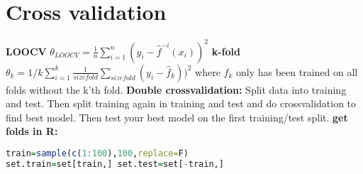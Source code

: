 \section{Cross validation}
\textbf{LOOCV} $\theta_{LOOCV} = \frac{1}{n}\sum_{i=1}^n(y_i - \hat f^{-i}(x_i))^2$
\textbf{k-fold} $\theta_k = 1/k\sum_{i=1}^k \frac{1}{size fold}\sum_{size fold}(y_i-\hat f_k))^2$ where $f_k$ only has been trained on all folds without the k'th fold. 
\textbf{Double crossvalidation: }Split data into training and test. Then split training again in training and test and do crossvalidation to find best model. Then test your best model on the first training/test split. 
\textbf{get folds in R: } \begin{lstlisting}[language=R]
train=sample(c(1:100),100,replace=F)
set.train=set[train,] set.test=set[-train,] \end{lstlisting}
